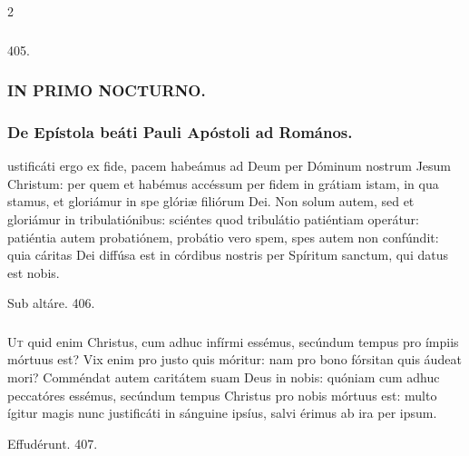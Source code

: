 \documentclass[9pt,twoside]{extarticle}
\begin{document}
\begin{multicols}{2}
\subsubsection*{\center {}}

\begin{tightlist}{}
\item {} 405. 
\end{tightlist}

\subsubsection*{\center \textsc{IN PRIMO NOCTURNO.}}
\subsubsection*{\center De Epístola beáti Pauli Apóstoli ad Romános.}
\begin{center}\end{center}
ustificáti ergo ex fide, pacem habeámus ad Deum per Dóminum nostrum Jesum Christum:
per quem et habémus accéssum per fidem in grátiam istam, in qua stamus, et gloriámur in spe glóriæ filiórum Dei.
Non solum autem, sed et gloriámur in tribulatiónibus: sciéntes quod tribulátio patiéntiam operátur:
patiéntia autem probatiónem, probátio vero spem,
spes autem non confúndit: quia cáritas Dei diffúsa est in córdibus nostris per Spíritum sanctum, qui datus est nobis.

\begin{tightlist}{}
\item {} Sub altáre. 406.
\end{tightlist}

\subsubsection*{\center {}}
\lettrine{U}t quid enim Christus, cum adhuc infírmi essémus, secúndum tempus pro ímpiis mórtuus est?
Vix enim pro justo quis móritur: nam pro bono fórsitan quis áudeat mori?
Comméndat autem caritátem suam Deus in nobis: quóniam cum adhuc peccatóres essémus, secúndum tempus
Christus pro nobis mórtuus est: multo ígitur magis nunc justificáti in sánguine ipsíus, salvi érimus ab ira per ipsum.

\begin{tightlist}{}
\item {} Effudérunt. 407.
\end{tightlist}


\end{multicols}
\end{document}
